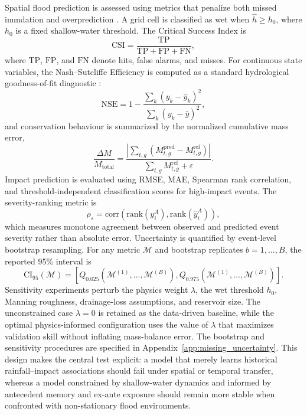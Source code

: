 \documentclass[pdflatex,sn-mathphys-ay]{sn-jnl}
\theoremstyle{thmstyleone}
\begin{document}
Spatial flood prediction is assessed using metrics that penalize both
missed inundation and overprediction \citep{Horritt2002}.  A grid cell is classified as wet
when $\hat{h}\geq h_{0}$, where $h_{0}$ is a fixed shallow-water
threshold.  The Critical Success Index is
\begin{equation}
  \mathrm{CSI}
  =
  \frac{\mathrm{TP}}
  {\mathrm{TP}+\mathrm{FP}+\mathrm{FN}},
  \label{eq:csi}
\end{equation}
where $\mathrm{TP}$, $\mathrm{FP}$, and $\mathrm{FN}$ denote hits,
false alarms, and misses.  For continuous state variables, the
Nash--Sutcliffe Efficiency is computed as a standard hydrological
goodness-of-fit diagnostic \citep{NASH1970282,Legates1999}:
\begin{equation}
  \mathrm{NSE}
  =
  1
  -
  \frac{
    \sum_{k}
    (y_{k}-\hat{y}_{k})^{2}
  }{
    \sum_{k}
    (y_{k}-\bar{y})^{2}
  },
  \label{eq:nse}
\end{equation}
and conservation behaviour is summarized by the normalized cumulative
mass error,
\begin{equation}
  \frac{\Delta M}{M_{\mathrm{total}}}
  =
  \frac{
    \left|
    \sum_{t,g}
    \left(
      M^{\mathrm{pred}}_{t,g}
      -
      M^{\mathrm{ref}}_{t,g}
    \right)
    \right|
  }{
    \sum_{t,g}
    M^{\mathrm{ref}}_{t,g}
    +
    \varepsilon
  }.
  \label{eq:mass_error}
\end{equation}
Impact prediction is evaluated using RMSE, MAE, Spearman rank
correlation, and threshold-independent classification scores for
high-impact events.  The severity-ranking metric is
\begin{equation}
  \rho_s
  =
  \mathrm{corr}
  \left(
    \mathrm{rank}(y_i^A),
    \mathrm{rank}(\hat{y}_i^A)
  \right),
  \label{eq:spearman_severity}
\end{equation}
which measures monotone agreement between observed and predicted event
severity rather than absolute error.  Uncertainty is quantified by
event-level bootstrap resampling.  For any metric $\mathcal{M}$ and bootstrap replicates
$b=1,\ldots,B$, the reported 95\% interval is
\begin{equation}
  \mathrm{CI}_{95}(\mathcal{M})
  =
  \left[
    Q_{0.025}
    \left(
      \mathcal{M}^{(1)},\ldots,\mathcal{M}^{(B)}
    \right),
    Q_{0.975}
    \left(
      \mathcal{M}^{(1)},\ldots,\mathcal{M}^{(B)}
    \right)
  \right].
  \label{eq:bootstrap_ci}
\end{equation}
Sensitivity experiments perturb the physics weight $\lambda$, the wet
threshold $h_0$, Manning roughness, drainage-loss assumptions, and
reservoir size.  The unconstrained case $\lambda=0$ is retained as the
data-driven baseline, while the optimal physics-informed configuration
uses the value of $\lambda$ that maximizes validation skill without
inflating mass-balance error.  The bootstrap and sensitivity procedures
are specified in Appendix~\ref{app:missing_uncertainty}.  This design
makes the central test explicit: a model that merely learns historical rainfall--impact
associations should fail under spatial or temporal transfer, whereas a
model constrained by shallow-water dynamics and informed by antecedent
memory and ex-ante exposure should remain more stable when confronted
with non-stationary flood environments.
\end{document}
